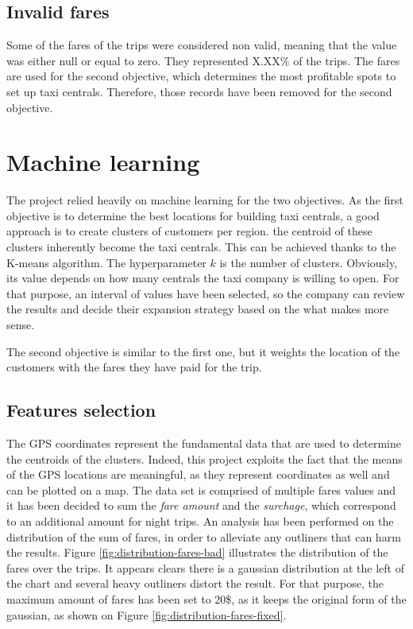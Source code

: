 ﻿\documentclass[a4paper]{article}
\begin{document}
\subsection{Invalid fares}
Some of the fares of the trips were considered non valid, meaning that the value was either null or equal to zero. They represented X.XX\% of the trips. The fares are used for the second objective, which determines the most profitable spots to set up taxi centrals. Therefore, those records have been removed for the second objective.



\section{Machine learning}
The project relied heavily on machine learning for the two objectives. As the first objective is to determine the best locations for building taxi centrals, a good approach is to create clusters of customers per region. the centroid of these clusters inherently become the taxi centrals. This can be achieved thanks to the K-means algorithm. The hyperparameter $k$ is the number of clusters. Obviously, its value depends on how many centrals the taxi company is willing to open. For that purpose, an interval of values have been selected, so the company can review the results and decide their expansion strategy based on the what makes more sense.

The second objective is similar to the first one, but it weights the location of the customers with the fares they have paid for the trip.



\subsection{Features selection}
The GPS coordinates represent the fundamental data that are used to determine the centroids of the clusters. Indeed, this project exploits the fact that the means of the GPS locations are meaningful, as they represent coordinates as well and can be plotted on a map. The data set is comprised of multiple fares values and it has been decided to sum the \emph{fare amount} and the \emph{surchage}, which correspond to an additional amount for night trips. An analysis has been performed on the distribution of the sum of fares, in order to alleviate any outliners that can harm the results. Figure \ref{fig:distribution-fares-bad} illustrates the distribution of the fares over the trips. It appears clears there is a gaussian distribution at the left of the chart and several heavy outliners distort the result. For that purpose, the maximum amount of fares has been set to 20\$, as it keeps the original form of the gaussian, as shown on Figure \ref{fig:distribution-fares-fixed}.
\end{document}
